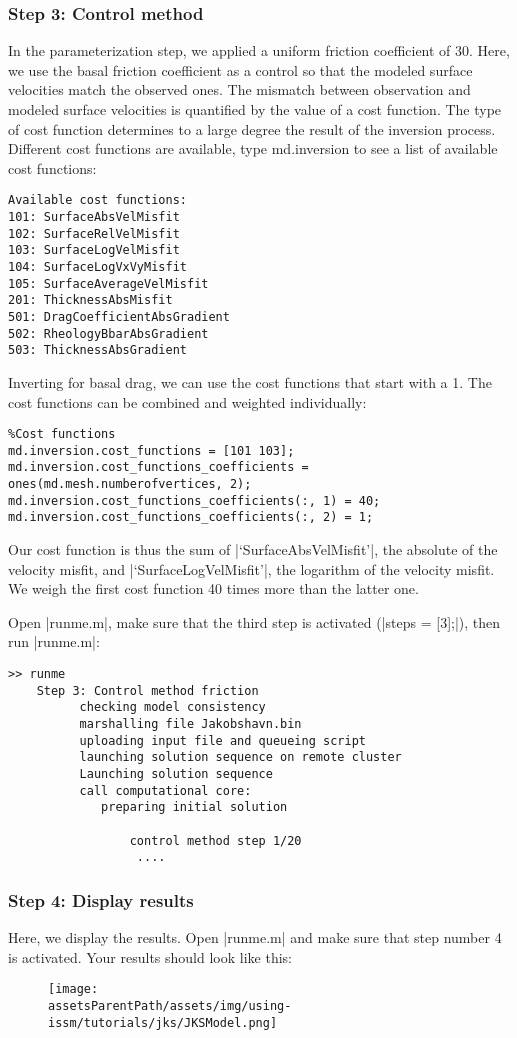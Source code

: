 \subsubsection{Step 3: Control method}
In the parameterization step, we applied a uniform friction coefficient of 30. Here, we use the basal friction coefficient as a control so that the modeled surface velocities match the observed ones. The mismatch between observation and modeled surface velocities is quantified by the value of a cost function. The type of cost function determines to a large degree the result of the inversion process. Different cost functions are available, type md.inversion to see a list of available cost functions:
\begin{lstlisting}
Available cost functions:
101: SurfaceAbsVelMisfit
102: SurfaceRelVelMisfit
103: SurfaceLogVelMisfit
104: SurfaceLogVxVyMisfit
105: SurfaceAverageVelMisfit
201: ThicknessAbsMisfit
501: DragCoefficientAbsGradient
502: RheologyBbarAbsGradient
503: ThicknessAbsGradient
\end{lstlisting}
Inverting for basal drag, we can use the cost functions that start with a 1. The cost functions can be combined and weighted individually:
\begin{lstlisting}
%Cost functions
md.inversion.cost_functions = [101 103];
md.inversion.cost_functions_coefficients = ones(md.mesh.numberofvertices, 2);
md.inversion.cost_functions_coefficients(:, 1) = 40;
md.inversion.cost_functions_coefficients(:, 2) = 1;
\end{lstlisting}
Our cost function is thus the sum of \lstinlinebg|`SurfaceAbsVelMisfit'|, the absolute of the velocity misfit, and \lstinlinebg|`SurfaceLogVelMisfit'|, the logarithm of the velocity misfit. We weigh the first cost function 40 times more than the latter one.

Open \lstinlinebg|runme.m|, make sure that the third step is activated (\lstinlinebg|steps = [3];|), then run \lstinlinebg|runme.m|:
\begin{lstlisting}
>> runme
	Step 3: Control method friction
		  checking model consistency
		  marshalling file Jakobshavn.bin
		  uploading input file and queueing script
		  launching solution sequence on remote cluster
		  Launching solution sequence
		  call computational core:
		     preparing initial solution

			     control method step 1/20
				  ....
\end{lstlisting}

\subsubsection{Step 4: Display results}
Here, we display the results. Open \lstinlinebg|runme.m| and make sure that step number 4 is activated. Your results should look like this:
\begin{figure}[H]
	\begin{center}
		\texttt{[image: \\assetsParentPath/assets/img/using-issm/tutorials/jks/JKSModel.png]}
	\end{center}
\end{figure}

\clearpage %
